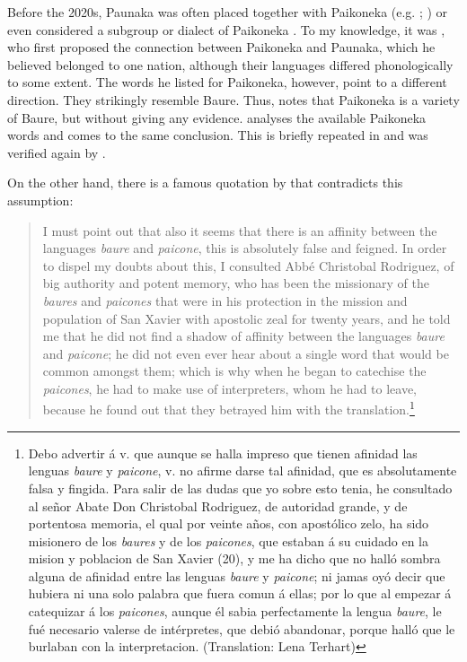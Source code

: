 Before the 2020s, Paunaka was often placed together with Pai\-ko\-ne\-ka  (e.g. \citealt[67]{Kaufman2007}; \citealt[34--35]{Aikhenvald2012}) or even considered a subgroup or dialect of Paikoneka \citep[e.g. in the glossary of][438]{MatienzoAL2011}.
To my knowledge, it was \citet[188]{Orbigny1839_2}, who first proposed the connection between Paikoneka and Paunaka, which he believed belonged to one nation, although their languages differed phonologically to some extent. The words he listed for Paikoneka, however, point to a different direction. They strikingly resemble Baure. Thus, \citet[31]{Ramirez2010} notes that Paikoneka is a variety of Baure, but without giving any evidence. \citet[]{Danielsen2013} analyses the available Paikoneka words and comes to the same conclusion. This is briefly repeated in \citet[225]{DanielsenTerhart2014} and was verified again by \citet[27]{Jolkesky2016}.

On the other hand, there is a famous quotation by \citet[160--161]{Hervas1800} that contradicts this assumption:

\begin{quotation}
I must point out that also it seems that there is an affinity between the languages \textit{baure} and \textit{paicone}, this is absolutely false and feigned. In order to dispel my doubts about this, I consulted Abbé Christobal Rodriguez, of big authority and potent memory, who has been the missionary of the \textit{baures} and \textit{paicones} that were in his protection in the mission and population of San Xavier with apostolic zeal for twenty years, and he told me that he did not find a shadow of affinity between the languages \textit{baure} and \textit{paicone}; he did not even ever hear about a single word that would be common amongst them; which is why when he began to catechise the \textit{paicones}, he had to make use of interpreters, whom he had to leave, because he found out that they betrayed him with the translation.\footnote{Debo advertir á v. que aunque se halla impreso que tienen afinidad las lenguas \textit{baure} y \textit{paicone}, v. no afirme darse tal afinidad, que es absolutamente falsa y fingida. Para salir de las dudas que yo sobre esto tenia, he consultado al señor Abate Don Christobal Rodriguez, de autoridad grande, y de portentosa memoria, el qual por veinte años, con apostólico zelo, ha sido misionero de los \textit{baures} y de los \textit{paicones}, que estaban á su cuidado en la mision y poblacion de San Xavier (20), y me ha dicho que no halló sombra alguna de afinidad entre las lenguas \textit{baure} y \textit{paicone}; ni jamas oyó decir que hubiera ni una solo palabra que fuera comun á ellas; por lo que al empezar á catequizar á los \textit{paicones}, aunque él sabia perfectamente la lengua \textit{baure}, le fué necesario valerse de intérpretes, que debió abandonar, porque halló que le burlaban con la interpretacion. (Translation: Lena Terhart)}
\end{quotation}

